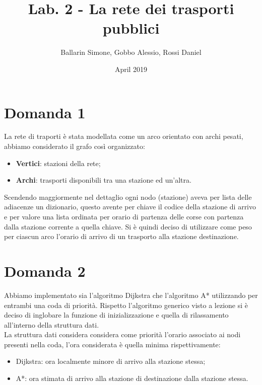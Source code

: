 \documentclass{article}
\title{Lab. 2 - La rete dei trasporti pubblici}
\author{Ballarin Simone, Gobbo Alessio, Rossi Daniel}
\date{April 2019}
\begin{document}
\maketitle

\section*{Domanda 1}
La rete di traporti è stata modellata come un arco orientato con archi pesati, abbiamo considerato il grafo così organizzato:
\begin{itemize}
	\item \textbf{Vertici}: stazioni della rete;
	\item \textbf{Archi}: trasporti disponibili tra una stazione ed un'altra.
\end{itemize}

Scendendo maggiormente nel dettaglio ogni nodo (stazione) aveva per lista delle adiacenze un dizionario, questo avente per chiave il codice della stazione di arrivo e per valore una lista ordinata per orario di partenza delle corse con partenza dalla stazione corrente a quella chiave.
Si è quindi deciso di utilizzare come peso per ciascun arco l'orario di arrivo di un trasporto alla stazione destinazione.

\section*{Domanda 2}
Abbiamo implementato sia l'algoritmo Dijkstra che l'algoritmo A* utilizzando per entrambi una coda di priorità.
Rispetto l'algoritmo generico visto a lezione si è deciso di inglobare la funzione di inizializzazione e quella di rilassamento all'interno della struttura dati.\\
La struttura dati considera considera come priorità l'orario associato ai nodi presenti nella coda, l'ora considerata è quella minima rispettivamente:
\begin{itemize}
	\item Dijkstra: ora localmente minore di arrivo alla stazione stessa;
	\item A*: ora stimata di arrivo alla stazione di destinazione dalla stazione stessa.
\end{itemize}

\newpage
\end{document}
